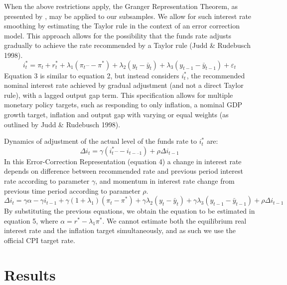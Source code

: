 \documentclass[notitlepage,12pt]{article}
\begin{document}
When the above restrictions apply, the Granger Representation Theorem, as presented by \cite{engle1987co}, may be applied to our subsamples.  We allow for such interest rate smoothing by estimating the Taylor rule in the context of an error correction model.  This approach allows for the possibility that the funds rate adjusts gradually to achieve the rate recommended by a Taylor rule (Judd \& Rudebusch 1998\nocite{judd1998taylor}).
\begin{equation} i_t^* = \pi_t + r_t^* + \lambda_1 (\pi_t –- \pi^*) + \lambda_2(y_{t}-{\bar  y}_{t}) + \lambda_3(y_{t-1}-{\bar  y}_{t-1})+\varepsilon_t
\end{equation}
Equation 3 is similar to equation 2, but instead considers $i_t^*$, the  recommended nominal interest rate achieved by gradual adjustment (and not a direct Taylor rule), with a lagged output gap term.  This specification allows for multiple monetary policy targets, such as responding to only inflation, a nominal GDP growth target, inflation and output gap with varying or equal weights (as outlined by Judd \& Rudebusch 1998\nocite{judd1998taylor}).

Dynamics of adjustment of the actual level of the funds rate to $i_t^*$ are: 
\begin{equation}
\Delta i_t = \gamma(i_t^* –- i_{t-–1}) + \rho\Delta i_{t-1}
\end{equation}
In this Error-Correction Representation (equation 4) a change in interest rate depends on difference between recommended rate and previous period interest rate according to parameter $\gamma$, and momentum in interest rate change from previous time period according to parameter $\rho$. 
\begin{equation}
\Delta i_t = \gamma\alpha - \gamma i_{t-1} + \gamma(1+\lambda_1)(\pi_t-\pi^*) + \gamma\lambda_2(y_{t}-{\bar  y}_{t})+\gamma\lambda_3(y_{t-1}-{\bar  y}_{t-1})+ \rho\Delta i_{t-1}
\end{equation}
By substituting the previous equations, we obtain the equation
to be estimated in equation 5, where $\alpha= r^* - \lambda_1\pi^*$.  We cannot estimate both the equilibrium real interest rate and the inflation target simultaneously, and as such we use the official CPI target rate.  

\section{Results}
\end{document}
